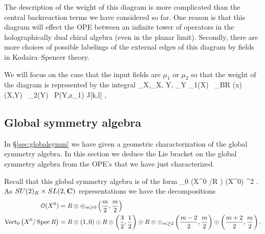 \documentclass[../main.tex]{subfiles}
\begin{document}
The description of the weight of this diagram is more complicated than the central backreaction terms we have considered so far.
One reason is that this diagram will effect the OPE between an infinite tower of operators in the holographically dual chiral algebra (even in the planar limit).
Secondly, there are more choices of possible labelings of the external edges of this diagram by fields in Kodaira--Spencer theory.

We will focus on the case that the input fields are $\mu_1$ or $\mu_2$ so that the weight of the diagram is represented by the integral
\beqn
\int_{X,\bfeta_X, Y, \bfeta_Y} \mu_1(X) \, \mu_{BR} (x) \,  \bP (X,Y) \, \mu_2(Y) \, P(Y,z_1) J[k,l] ,
\eeqn

\subsection{Global symmetry algebra}

In \S \ref{sec:globalsymm} we have given a geometric characterization of the global symmetry algebra.
In this section we deduce the Lie bracket on the global symmetry algebra from the OPE's that we have just characterized.

Recall that this global symmetry algebra is of the form
\beqn
{}_0 \left(X^0 \slash \Spec R \right) \oplus \cO(X^0) \otimes \Pi \C^2 .
\eeqn
As $SU(2)_R \times SL(2,\mathbf{C})$ representations we have the decompositions
\begin{align*}
\mathcal O(X^0) & = R \otimes \oplus_{m \geq 0} \left(\frac{m}{2}, \frac{m}{2} \right) \\
\operatorname{Vect}_0 \left(X^0 \slash \operatorname{Spec} R \right) & = R \otimes \left(1,0\right) \oplus R \otimes \left(\frac32, \frac12\right) \oplus R \otimes \oplus_{m \geq 2} \left(\frac{m-2}{2},\frac{m}2\right) \oplus \left(\frac{m+2}{2}, \frac{m}{2}\right) .
\end{align*}
\end{document}
